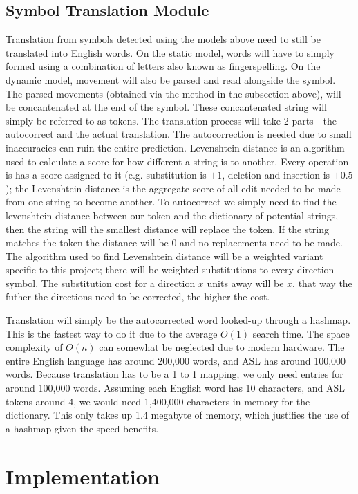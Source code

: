 \documentclass[11pt]{article}
\begin{document}
        \subsection{Symbol Translation Module}
        Translation from symbols detected using the models above need to still be translated into English words. On the static model, words will have to simply formed using a combination of letters also known as fingerspelling. On the dynamic model, movement will also be parsed and read alongside the symbol. The parsed movements (obtained via the method in the subsection above), will be concantenated at the end of the symbol. These concantenated string will simply be referred to as tokens. The translation process will take 2 parts - the autocorrect and the actual translation. The autocorrection is needed due to small inaccuracies can ruin the entire prediction. Levenshtein distance is an algorithm used to calculate a score for how different a string is to another. Every operation is has a score assigned to it (e.g. substitution is $+1$, deletion and insertion is $+0.5$); the Levenshtein distance is the aggregate score of all edit needed to be made from one string to become another. To autocorrect we simply need to find the levenshtein distance between our token and the dictionary of potential strings, then the string will the smallest distance will replace the token. If the string matches the token the distance will be 0 and no replacements need to be made. The algorithm used to find Levenshtein distance will be a weighted variant specific to this project; there will be weighted substitutions to every direction symbol. The substitution cost for a direction $x$ units away will be $x$, that way the futher the directions need to be corrected, the higher the cost.


        Translation will simply be the autocorrected word looked-up through a hashmap. This is the fastest way to do it due to the average $O(1)$ search time. The space complexity of $O(n)$ can somewhat be neglected due to modern hardware. The entire English language has around 200,000 words, and ASL has around 100,000 words. Because translation has to be a 1 to 1 mapping, we only need entries for around 100,000 words. Assuming each English word has 10 characters, and ASL tokens around 4, we would need 1,400,000 characters in memory for the dictionary. This only takes up 1.4 megabyte of memory, which justifies the use of a hashmap given the speed benefits.
        

\section{Implementation}
\end{document}
